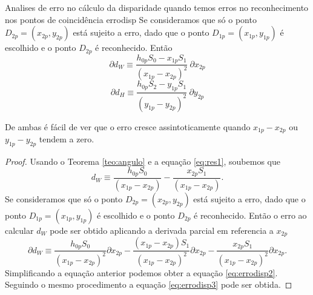 \documentclass[a4paper,10pt]{article}
\begin{document}
\begin{theoremtcolorbox}{Analises de erro no cálculo da disparidade quando temos erros no reconhecimento nos pontos de coincidência }{errodisp}
Se consideramos que só o ponto $D_{2p}=(x_{2p},y_{2p})$ está sujeito a erro, dado que 
o ponto $D_{1p}=(x_{1p},y_{1p})$ é escolhido e o ponto $D_{2p}$ é reconhecido. Então
\begin{equation}\label{eq:errodisp2}
 \partial d_W \equiv \frac{h_{0p}S_0-x_{1p}S_1}{(x_{1p}-x_{2p})^2}~\partial x_{2p}
\end{equation}
\begin{equation}\label{eq:errodisp3}
 \partial d_H \equiv \frac{h_{0p}S_2-y_{1p}S_1}{(y_{1p}-y_{2p})^2}~\partial y_{2p}
\end{equation}

De ambas é fácil de ver que o erro cresce assintoticamente quando $x_{1p}-x_{2p}$ ou $y_{1p}-y_{2p}$ tendem a zero.
\end{theoremtcolorbox}
\begin{proof}
 Usando o Teorema \ref{teo:angulo} e a equação \eqref{eq:res1}, soubemos que
\begin{equation}\label{eq:err1}
 d_W \equiv  \frac{ h_{0p} S_0}{(x_{1p}-x_{2p})}-\frac{x_{2p} S_1}{(x_{1p}-x_{2p})}.
\end{equation}
Se consideramos que só o ponto $D_{2p}=(x_{2p},y_{2p})$ está sujeito a erro, dado que 
o ponto $D_{1p}=(x_{1p},y_{1p})$ é escolhido e o ponto $D_{2p}$ é reconhecido. 
Então o erro ao calcular $d_W$ pode ser obtido aplicando a derivada parcial em referencia a
$x_{2p}$
\begin{equation}\label{eq:err2}
 \partial d_W \equiv  \frac{ h_{0p} S_0}{(x_{1p}-x_{2p})^2} \partial x_{2p}-\frac{(x_{1p}-x_{2p}) S_1}{(x_{1p}-x_{2p})^2} \partial x_{2p}-\frac{x_{2p} S_1}{(x_{1p}-x_{2p})^2} \partial x_{2p}.
\end{equation}
Simplificando a equação anterior podemos obter a equação \eqref{eq:errodisp2}. Seguindo o mesmo
procedimento a equação \eqref{eq:errodisp3} pode ser obtida.
\end{proof}




\end{document}
